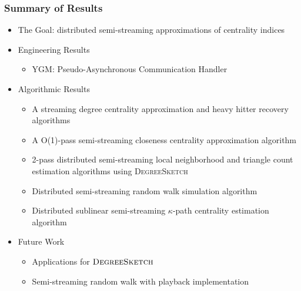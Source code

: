 \documentclass{beamer}
\newcommand{\algoname}[1]{\textnormal{\textsc{#1}}}
\begin{document}
\begin{frame}
\frametitle{Summary of Results}

\begin{itemize}
	\item The Goal: distributed semi-streaming approximations of centrality indices
	\item Engineering Results
	\begin{itemize}
		\item \algoname{YGM}: Pseudo-Asynchronous 	Communication Handler
	\end{itemize}
	\item Algorithmic Results
	\begin{itemize}
		\item A streaming degree centrality approximation and heavy hitter recovery algorithms
		\item A O(1)-pass semi-streaming closeness centrality approximation algorithm
		\item 2-pass distributed semi-streaming local neighborhood and triangle count estimation algorithms using \algoname{DegreeSketch}
		\item Distributed semi-streaming random walk simulation algorithm
		\item Distributed sublinear semi-streaming $\kappa$-path centrality estimation algorithm
	\end{itemize}
	\item Future Work
	\begin{itemize}
		\item Applications for $\algoname{DegreeSketch}$
		\item Semi-streaming random walk with playback implementation
	\end{itemize}
\end{itemize}

\end{frame}


\end{document}
